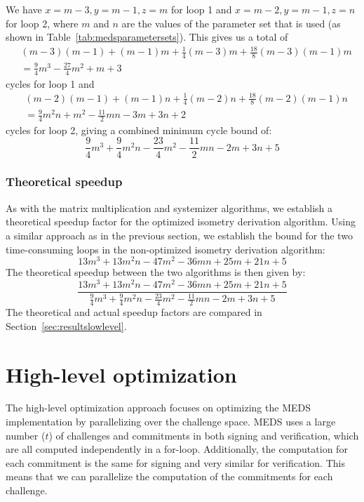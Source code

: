\documentclass[11pt,a4paper]{report}
\theoremstyle{definition}
\begin{document}
We have $x = m - 3, y = m - 1, z = m$ for loop 1 and $x = m - 2, y = m - 1, z = n$ for loop 2, where $m$ and $n$ are the values of the parameter set that is used (as shown in Table~\ref{tab:medsparametersets}). This gives us a total of
\begin{align*}
   & (m - 3)(m - 1) + (m - 1)m + \frac{1}{4}(m - 3)m + \frac{18}{8}(m - 3)(m - 1)m \\
   & = \frac{9}{4} m^3 - \frac{27}{4} m^2 + m + 3
\end{align*}
cycles for loop 1 and
\begin{align*}
   & (m - 2)(m - 1) + (m - 1)n + \frac{1}{4}(m - 2)n + \frac{18}{8}(m - 2)(m - 1)n \\
   & = \frac{9}{4} m^2 n + m^2 - \frac{11}{2} m n - 3 m + 3 n + 2
\end{align*}
cycles for loop 2, giving a combined minimum cycle bound of:
\[
  \frac{9}{4} m^3 + \frac{9}{4} m^2 n - \frac{23}{4} m^2 - \frac{11}{2} m n - 2 m + 3 n + 5
\]

\subsubsection{Theoretical speedup}
As with the matrix multiplication and systemizer algorithms, we establish a theoretical speedup factor for the optimized isometry derivation algorithm. Using a similar approach as in the previous section, we establish the bound for the two time-consuming loops in the non-optimized isometry derivation algorithm:
\[
  13 m^3 + 13 m^2 n - 47 m^2 - 36 m n + 25 m + 21 n + 5
\]
The theoretical speedup between the two algorithms is then given by:
\[
  \frac{13 m^3 + 13 m^2 n - 47 m^2 - 36 m n + 25 m + 21 n + 5}{\frac{9}{4} m^3 + \frac{9}{4} m^2 n - \frac{23}{4} m^2 - \frac{11}{2} m n - 2 m + 3 n + 5}
\]
The theoretical and actual speedup factors are compared in Section~\ref{sec:resultslowlevel}.

\section{High-level optimization}
\label{sec:highleveloptimization}
The high-level optimization approach focuses on optimizing the MEDS implementation by parallelizing over the challenge space. MEDS uses a large number ($t$) of challenges and commitments in both signing and verification, which are all computed independently in a for-loop. Additionally, the computation for each commitment is the same for signing and very similar for verification. This means that we can parallelize the computation of the commitments for each challenge.
\end{document}
